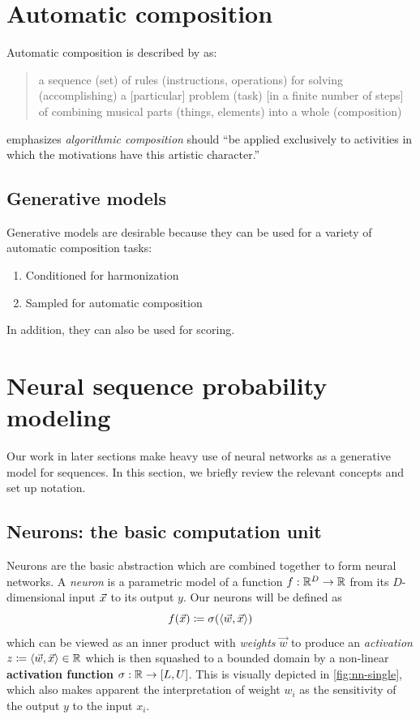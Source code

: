 \section{Automatic composition}\label{sec:automatic-composition}

Automatic composition is described by \citet{papadopoulos1999ai} as:
\begin{quote}
  a sequence (set) of rules (instructions, operations) for solving (accomplishing) a [particular] problem (task)
  [in a finite number of steps] of combining musical parts (things, elements) into a whole (composition)
\end{quote}
\citet{pearce2002motivations} emphasizes \emph{algorithmic composition} should ``be applied exclusively
to activities in which the motivations have this artistic character.''


\subsection{Generative models}

Generative models are desirable because they can be used for a variety of
automatic composition tasks:
\begin{enumerate}
  \item Conditioned for harmonization
  \item Sampled for automatic composition
\end{enumerate}
In addition, they can also be used for scoring.

\section{Neural sequence probability modeling}

Our work in later sections make heavy use of neural networks as a generative
model for sequences. In this section, we briefly review the relevant concepts and set up notation.

\subsection{Neurons: the basic computation unit}

Neurons are the basic abstraction which are combined together to form
neural networks. A \emph{neuron} is a parametric model of a function $f : \mathbb{R}^D \to
\mathbb{R}$ from its $D$-dimensional input $\vec{x}$ to its output $y$. Our neurons will be
defined as
\begin{equation}
    f(\vec{x}) \coloneqq \sigma( \langle \vec{w}, \vec{x} \rangle)
\end{equation}
which can be viewed as an inner product with \emph{weights} $\vec{w}$ to
produce an \emph{activation} $z \coloneqq \langle \vec{w}, \vec{x} \rangle
\in \mathbb{R}$ which is then squashed to a bounded domain by a non-linear
\textbf{activation function} $\sigma : \mathbb{R} \to [L, U]$. This is visually
depicted in \cref{fig:nn-single}, which also makes apparent the
interpretation of weight $w_i$ as the sensitivity of the output $y$ to the
input $x_i$.

